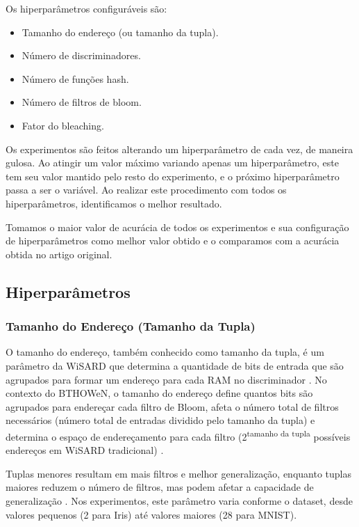 \documentclass{article}
\begin{document}
Os hiperparâmetros configuráveis são:

\begin{itemize}
    \item Tamanho do endereço (ou tamanho da tupla).
    \item Número de discriminadores.
    \item Número de funções hash.
    \item Número de filtros de bloom.
    \item Fator do bleaching.
\end{itemize}

Os experimentos são feitos alterando um hiperparâmetro de cada vez, de maneira gulosa. Ao atingir um valor máximo variando apenas um hiperparâmetro, este tem seu valor mantido pelo resto do experimento, e o próximo hiperparâmetro passa a ser o variável. Ao realizar este procedimento com todos os hiperparâmetros, identificamos o melhor resultado.

Tomamos o maior valor de acurácia de todos os experimentos e sua configuração de hiperparâmetros como melhor valor obtido e o comparamos com a acurácia obtida no artigo original.

\subsection{Hiperparâmetros}

\subsubsection{Tamanho do Endereço (Tamanho da Tupla)}

O tamanho do endereço, também conhecido como tamanho da tupla, é um parâmetro da WiSARD que determina a quantidade de bits de entrada que são agrupados para formar um endereço para cada RAM no discriminador \cite{lima2020wisardpkg}. 
No contexto do BTHOWeN, o tamanho do endereço define quantos bits são agrupados para endereçar cada filtro de Bloom, afeta o número total de filtros necessários (número total de entradas dividido pelo tamanho da tupla) e determina o espaço de endereçamento para cada filtro (2\textsuperscript{tamanho da tupla} possíveis endereços em WiSARD tradicional) \cite{santiago2023}.

Tuplas menores resultam em mais filtros e melhor generalização, enquanto tuplas maiores reduzem o número de filtros, mas podem afetar a capacidade de generalização \cite{santiago2020}. Nos experimentos, este parâmetro varia conforme o dataset, desde valores pequenos (2 para Iris) até valores maiores (28 para MNIST).
\end{document}
